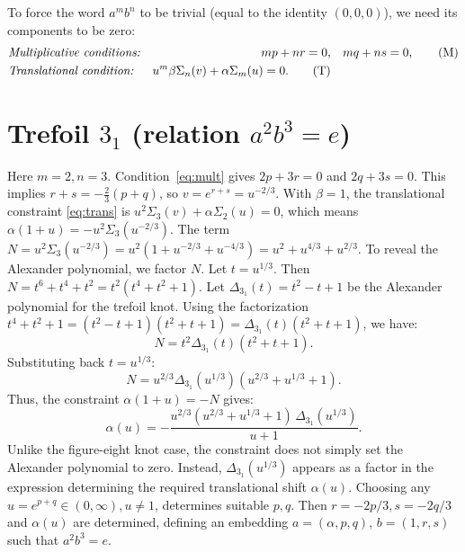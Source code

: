 \documentclass{article}
\begin{document}
To force the word $a^{m}b^{n}$ to be trivial (equal to the identity $(0,0,0)$), we need its components to be zero:
\begin{align}
&\text{\textit{Multiplicative conditions:}} & mp+nr=0, & \quad mq+ns=0, \label{eq:mult} \tag{M} \\
&\text{\textit{Translational condition:}} & u^m \beta\Sigma_{n}(v) + \alpha\Sigma_{m}(u)=0. \label{eq:trans} \tag{T}
\end{align}

\section{Trefoil $3_1$ (relation $a^{2}b^{3}=e$)}
Here $m=2, n=3$. Condition~\eqref{eq:mult} gives $2p+3r=0$ and $2q+3s=0$. This implies $r+s = -\frac{2}{3}(p+q)$, so $v = e^{r+s} = u^{-2/3}$.
With $\beta=1$, the translational constraint \eqref{eq:trans} is $u^2 \Sigma_3(v) + \alpha \Sigma_2(u) = 0$, which means $\alpha(1+u) = -u^2 \Sigma_3(u^{-2/3})$.
The term $N = u^2 \Sigma_3(u^{-2/3}) = u^2(1+u^{-2/3}+u^{-4/3}) = u^2 + u^{4/3} + u^{2/3}$.
To reveal the Alexander polynomial, we factor $N$.
Let $t=u^{1/3}$. Then $N = t^6 + t^4 + t^2 = t^2(t^4+t^2+1)$.
Let $\Delta_{3_1}(t) = t^2 - t + 1$ be the Alexander polynomial for the trefoil knot.
Using the factorization $t^4+t^2+1 = (t^2-t+1)(t^2+t+1) = \Delta_{3_1}(t)(t^2+t+1)$, we have:
\begin{equation*}
    N = t^2 \Delta_{3_1}(t) (t^2+t+1).
\end{equation*}
Substituting back $t=u^{1/3}$:
\begin{equation*}
    N = u^{2/3} \Delta_{3_1}(u^{1/3}) (u^{2/3} + u^{1/3} + 1).
\end{equation*}
Thus, the constraint $\alpha(1+u) = -N$ gives:
\begin{equation}
\alpha(u) = - \frac{u^{2/3} (u^{2/3} + u^{1/3} + 1) \, \Delta_{3_1}(u^{1/3})}{u+1}.
\end{equation}
Unlike the figure-eight knot case, the constraint does not simply set the Alexander polynomial to zero. Instead, $\Delta_{3_1}(u^{1/3})$ appears as a factor in the expression determining the required translational shift $\alpha(u)$. Choosing any $u=e^{p+q} \in (0,\infty), u\ne1$, determines suitable $p,q$. Then $r=-2p/3, s=-2q/3$ and $\alpha(u)$ are determined, defining an embedding $a=(\alpha,p,q)$, $b=(1,r,s)$ such that $a^2 b^3 = e$.
\end{document}
